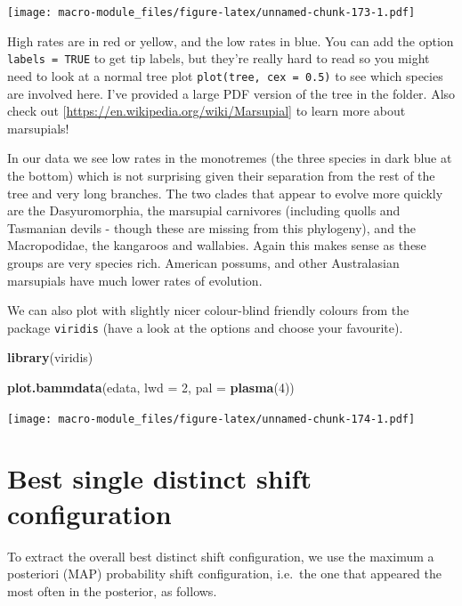 \documentclass[]{book}
\newenvironment{Shaded}{\begin{snugshade}}{\end{snugshade}}
\newcommand{\KeywordTok}[1]{\textcolor[rgb]{0.13,0.29,0.53}{\textbf{{#1}}}}
\newcommand{\DataTypeTok}[1]{\textcolor[rgb]{0.13,0.29,0.53}{{#1}}}
\newcommand{\DecValTok}[1]{\textcolor[rgb]{0.00,0.00,0.81}{{#1}}}
\newcommand{\NormalTok}[1]{{#1}}
\begin{document}
\texttt{[image: macro-module\_files/figure-latex/unnamed-chunk-173-1.pdf]}

High rates are in red or yellow, and the low rates in blue. You can add
the option \texttt{labels\ =\ TRUE} to get tip labels, but they're
really hard to read so you might need to look at a normal tree plot
\texttt{plot(tree,\ cex\ =\ 0.5)} to see which species are involved
here. I've provided a large PDF version of the tree in the folder. Also
check out {[}\url{https://en.wikipedia.org/wiki/Marsupial}{]} to learn
more about marsupials!

In our data we see low rates in the monotremes (the three species in
dark blue at the bottom) which is not surprising given their separation
from the rest of the tree and very long branches. The two clades that
appear to evolve more quickly are the Dasyuromorphia, the marsupial
carnivores (including quolls and Tasmanian devils - though these are
missing from this phylogeny), and the Macropodidae, the kangaroos and
wallabies. Again this makes sense as these groups are very species rich.
American possums, and other Australasian marsupials have much lower
rates of evolution.

We can also plot with slightly nicer colour-blind friendly colours from
the package \texttt{viridis} (have a look at the options and choose your
favourite).

\begin{Shaded}
\begin{Highlighting}[]
\KeywordTok{library}\NormalTok{(viridis)}

\KeywordTok{plot.bammdata}\NormalTok{(edata, }\DataTypeTok{lwd =} \DecValTok{2}\NormalTok{, }\DataTypeTok{pal =} \KeywordTok{plasma}\NormalTok{(}\DecValTok{4}\NormalTok{))}
\end{Highlighting}
\end{Shaded}

\texttt{[image: macro-module\_files/figure-latex/unnamed-chunk-174-1.pdf]}

\section{Best single distinct shift
configuration}\label{best-single-distinct-shift-configuration}

To extract the overall best distinct shift configuration, we use the
maximum a posteriori (MAP) probability shift configuration, i.e.~the one
that appeared the most often in the posterior, as follows.
\end{document}
